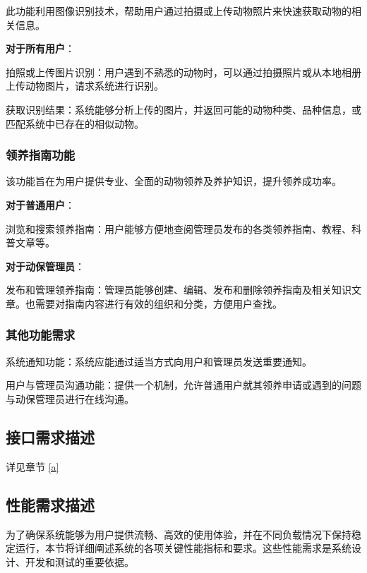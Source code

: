 \documentclass[12pt,a4paper,UTF8]{article}
\begin{document}
此功能利用图像识别技术，帮助用户通过拍摄或上传动物照片来快速获取动物的相关信息。

\vspace{0.25cm}

\noindent\textbf{对于所有用户}：

拍照或上传图片识别：用户遇到不熟悉的动物时，可以通过拍摄照片或从本地相册上传动物图片，请求系统进行识别。

获取识别结果：系统能够分析上传的图片，并返回可能的动物种类、品种信息，或匹配系统中已存在的相似动物。

\subsubsection{领养指南功能}

该功能旨在为用户提供专业、全面的动物领养及养护知识，提升领养成功率。

\vspace{0.25cm}

\noindent\textbf{对于普通用户}：

浏览和搜索领养指南：用户能够方便地查阅管理员发布的各类领养指南、教程、科普文章等。

\vspace{0.25cm}

\noindent\textbf{对于动保管理员}：

发布和管理领养指南：管理员能够创建、编辑、发布和删除领养指南及相关知识文章。也需要对指南内容进行有效的组织和分类，方便用户查找。

\subsubsection{其他功能需求}

系统通知功能：系统应能通过适当方式向用户和管理员发送重要通知。

用户与管理员沟通功能：提供一个机制，允许普通用户就其领养申请或遇到的问题与动保管理员进行在线沟通。

\subsection{接口需求描述}

详见章节 \ref{a}

\subsection{性能需求描述}

为了确保系统能够为用户提供流畅、高效的使用体验，并在不同负载情况下保持稳定运行，本节将详细阐述系统的各项关键性能指标和要求。这些性能需求是系统设计、开发和测试的重要依据。
\end{document}
